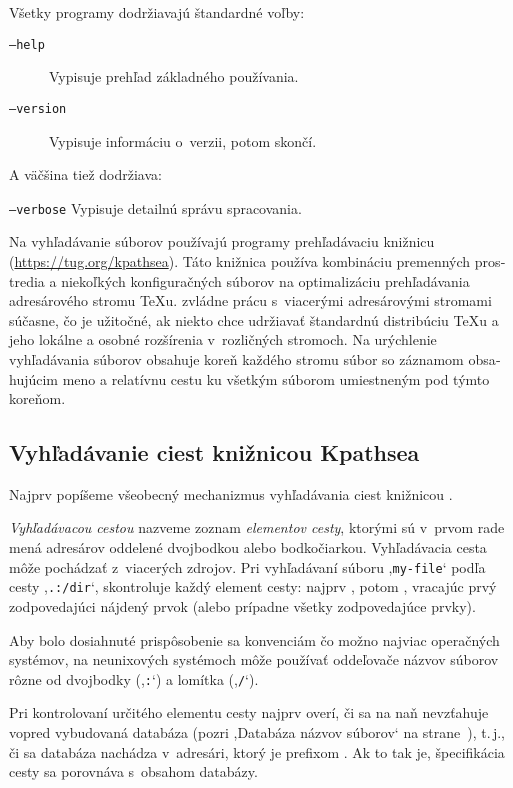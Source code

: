 \documentclass[\classoptions,slovak,english,czech]{\classname}
\newcommand{\singleuv}[1]{,#1`}
\begin{document}
\begin{otherlanguage}{slovak}
Všetky programy dodržiavajú štandardné \GNU{} voľby:

\begin{description}
\item[\texttt{--help}] Vypisuje prehľad základného používania.
\item[\texttt{--version}] Vypisuje informáciu o~verzii, potom skončí.
\end{description}

A väčšina tiež dodržiava:
\begin{ttdescription}
\item[\texttt{--verbose}] Vypisuje detailnú správu spracovania.
\end{ttdescription}

Na vyhľadávanie súborov používajú \Webc{} programy prehľadávaciu
knižnicu \KPS{} (\url{https://tug.org/kpathsea}).
Táto knižnica používa kombináciu premenných
prostredia a niekoľkých konfiguračných súborov na optimalizáciu
prehľadávania adresárového stromu \TeX u{}. \Webc{}  zvládne
prácu s~viacerými adresárovými stromami súčasne, čo je
užitočné, ak niekto chce udržiavať štandardnú distribúciu \TeX u a jeho
lokálne a osobné rozšírenia v~rozličných stromoch. Na urýchlenie
vyhľadávania súborov obsahuje koreň každého stromu súbor
 so záznamom obsahujúcim meno a relatívnu cestu ku
všetkým súborom umiestneným pod týmto koreňom.


\subsection{Vyhľadávanie ciest knižnicou Kpathsea}
\label{sec:kpathsea}
Najprv popíšeme všeobecný mechanizmus vyhľadávania ciest
knižnicou \KPS{}.

\emph{Vyhľadávacou cestou} nazveme zoznam \emph{elementov cesty},
ktorými sú v~prvom rade mená adresárov
oddelené dvojbodkou alebo bodkočiarkou.
Vyhľadávacia cesta môže pochádzať z~viacerých zdrojov.
Pri vyhľadávaní súboru \singleuv{\texttt{my-file}} podľa cesty \singleuv{\texttt{.:/dir}},
\KPS{} skontroluje každý element cesty: najprv ,
potom , vracajúc prvý zodpovedajúci nájdený
prvok (alebo prípadne všetky zodpovedajúce prvky).

Aby bolo dosiahnuté prispôsobenie sa konvenciám čo možno najviac
operačných systémov, na neunixových systémoch \KPS{} môže používať
oddeľovače názvov súborov rôzne od dvojbodky (\singleuv{\texttt{:}}) a
lomítka (\singleuv{\texttt{/}}).

Pri kontrolovaní určitého elementu cesty  \KPS{} najprv
overí, či sa na naň nevzťahuje vopred vybudovaná databáza (pozri
\singleuv{Data\-báza názvov súborov} na
strane~\pageref{sec:filename.database}), t.\,j., či sa databáza nachádza
v~adresári, ktorý je prefixom . Ak to tak je, špecifikácia
cesty sa porovnáva s~obsahom databázy.


\end{otherlanguage}
\end{document}
